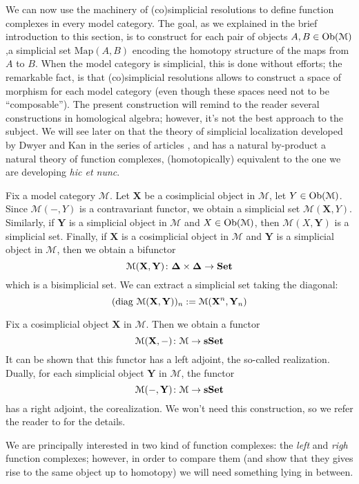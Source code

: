 \begin{refsection}
We can now use the machinery of (co)simplicial resolutions to define function complexes in every model category. The goal, as we explained in the brief introduction to this section, is to construct for each pair of objects $A,B \in \operatorname{Ob}(\mathcal M)$,a simplicial set $\mathrm{Map}(A,B)$ encoding the homotopy structure of the maps from $A$ to $B$. When the model category is simplicial, this is done without efforts; the remarkable fact, is that (co)simplicial resolutions allows to construct a space of morphism for each model category (even though these spaces need not to be ``composable''). The present construction will remind to the reader several constructions in homological algebra; however, it's not the best approach to the subject. We will see later on that the theory of simplicial localization developed by Dwyer and Kan in the series of articles \cite{dksimplicial}, \cite{dkcomputing} and \cite{dkfunction} has a natural by-product a natural theory of function complexes, (homotopically) equivalent to the one we are developing \emph{hic et nunc}.

Fix a model category $\mathcal M$. Let $\mathbf{X}$ be a cosimplicial object in $\mathcal M$, let $Y \in \operatorname{Ob}(\mathcal M)$. Since $\mathcal M(-,Y)$ is a contravariant functor, we obtain a simplicial set $\mathcal M(\mathbf X,Y)$. Similarly, if $\mathbf Y$ is a simplicial object in $\mathcal M$ and $X \in \operatorname{Ob}(\mathcal M)$, then $\mathcal M(X,\mathbf Y)$ is a simplicial set. Finally, if $\mathbf X$ is a cosimplicial object in $\mathcal M$ and $\mathbf Y$ is a simplicial object in $\mathcal M$, then we obtain a bifunctor
\[
\mathcal M(\mathbf X,\mathbf Y) \colon \mathbf \Delta \times \mathbf \Delta \to \mathbf{Set}
\]
which is a bisimplicial set. We can extract a simplicial set taking the diagonal:
\[
(\operatorname{\mathrm{diag} \,} \mathcal M(\mathbf X,\mathbf Y))_n := \mathcal M(\mathbf X^n,\mathbf Y_n)
\]

\begin{rmk}
Fix a cosimplicial object $\mathbf X$ in $\mathcal M$. Then we obtain a functor
\[
\mathcal M(\mathbf X, -) \colon \mathcal M \to \mathbf{sSet}
\]
It can be shown that this functor has a left adjoint, the so-called realization. Dually, for each simplicial object $\mathbf Y$ in $\mathcal M$, the functor
\[
\mathcal M(-,\mathbf Y) \colon \mathcal M \to \mathbf{sSet}
\]
has a right adjoint, the corealization. We won't need this construction, so we refer the reader to \cite[Ch. 16.3]{hirschhorn} for the details.
\end{rmk}

We are principally interested in two kind of function complexes: the \emph{left} and \emph{righ} function complexes; however, in order to compare them (and show that they gives rise to the same object up to homotopy) we will need something lying in between.


\end{refsection}
